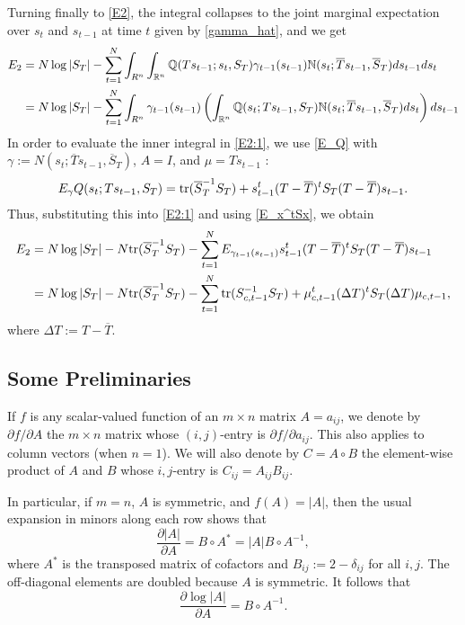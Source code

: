 \documentclass[12pt,leqno]{article}
\begin{document}
 Turning finally to  \eqref{E2}, the integral collapses to the 
joint marginal expectation over $s_t$ and $s_{t-1}$ at time $t$ given by \eqref{gamma_hat}, and we get
\begin{equation}\label{E2:1}
  \begin{split}
    E_2 &= N\log|S_T| - \sum_{t=1}^N\int_{R^n}
    \int_{{\mathbb R}^{n}}{\mathbb Q}(Ts_{t-1};s_t,S_T)\gamma_{t-1}(s_{t-1}){\mathbb N}(s_t;\overline{T}s_{t-1},\overline{S}_T)ds_{t-1}ds_t\\
    &= N\log|S_T| - \sum_{t=1}^N\int_{R^n}\gamma_{t-1}(s_{t-1})\left(\int_{{\mathbb R}^{n}}{\mathbb Q}(s_t;Ts_{t-1},S_T)
    {\mathbb N}(s_t;\overline{T}s_{t-1},\overline{S}_T)ds_t\right)ds_{t-1}\\
  \end{split}
  \end{equation}
In order to evaluate the inner integral in \eqref{E2:1}, we use \eqref{E_Q} 
with $\gamma := N(s_t;\overline{T}s_{t-1},\overline{S}_T)$,  $A = I$,  and $ \mu = Ts_{t-1}$ :
$$
E_{\gamma}Q(s_t;Ts_{t-1},S_T) = \text{\rm tr}(\overline{S}_T^{-1}S_T) + s_{t-1}^t(T - \overline{T})^tS_T(T - \overline{T})s_{t-1}.
$$
Thus, substituting this into \eqref{E2:1} and using \eqref{E_x^tSx}, we obtain
\begin{equation}\label{E2:2}
  \begin{split}
    E_2 &= N\log|S_T| - N\text{\rm tr}(\overline{S}_T^{-1}S_T) - \sum_{t=1}^N E_{\gamma_{t-1}(s_{t-1})}s_{t-1}^t(T - \overline{T})^t
    S_T(T - \overline{T})s_{t-1} \\
    &= N\log|S_T| - N\text{\rm tr}(\overline{S}_T^{-1}S_T) -\sum_{t=1}^N \text{\rm tr}(S_{c,t-1}^{-1}S_T) + \mu_{c,t-1}^t(\Delta{T})^tS_T
    (\Delta{T})\mu_{c,t-1},
  \end{split}
\end{equation}
where $\Delta{T} := T - \overline{T}$.
\subsection{Some Preliminaries}
If $f$ is any scalar-valued function of an $m\times{n}$ matrix $A = a_{ij}$, we denote by $\partial{f}/\partial{A}$ the 
$m\times{n}$ matrix whose $(i,j)$-entry is $\partial{f}/\partial{a_{ij}}$.  This also applies to column vectors
(when $n=1$). We will also denote by $C = A\circ{B}$ the element-wise product of $A$ and $B$ whose $i,j$-entry is
$C_{ij} = A_{ij}B_{ij}$.

In particular, if $m=n$, $A$ is symmetric, and $f(A) = |A|$,  then the usual expansion 
in minors along each row shows that 
$$
\frac{\partial{|A|}}{\partial{A}} = B\circ{A}^* = |A|B\circ{A}^{-1},
$$
where $A^*$ is the transposed matrix of cofactors and $B_{ij} := 2-\delta_{ij}$ for all $i,j$.
The off-diagonal elements are doubled because $A$ is symmetric.
It follows that
\begin{equation}\label{partial_logdet}
  \frac{\partial{\log|A|}}{\partial{A}} = B\circ{A}^{-1}. 
\end{equation}
\end{document}
